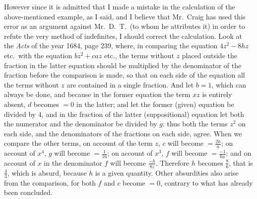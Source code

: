 \documentclass[twoside,openright]{article}
\begin{document}
However since it is admitted that I made a mistake in the calculation
of the above-mentioned example, as I said, and I believe that Mr.\
Craig has used this error as an argument against Mr.\ D.\ T.\ (to whom
he attributes it) in order to refute the very method of indefinites, I
should correct the calculation.  Look at the {\em Acts} of the year
1684, page 239, where, in comparing the equation $4z^2-8hz$ etc.\ with
the equation $bz^2+caz$ etc., the terms without $z$ placed outside the
fraction in the latter equation should be multiplied by the
denominator of the fraction before the comparison is made, so that on
each side of the equation all the terms without $z$ are contained in a
single fraction.  And let $b=1$, which can always be done, and because
in the former equation the term $xz$ is entirely absent, $d$ becomes
$=0$ in the latter; and let the former (given) equation be divided by
$4$, and in the fraction of the latter (suppositional) equation let
both the numerator and the denominator be divided by $g$: thus both
the terms $z^2$ on each side, and the denominators of the fractions on
each side, agree.  When we compare the other terms, on account of the
term $z$, $c$ will become $= \frac{2h}{a}$; on account of $x^4$, $g$
will become $=\frac{1}{16}$; on account of $x^3$, $f$ will become
$= \frac{-1}{6a}$; and on account of $x$ in the denominator $f$ will
become $\frac{-h}{8z}$.  Therefore $h$ becomes $\frac{8}{6}$, that is
$\frac{4}{3}$, which is absurd, because $h$ is a given quantity.
Other absurdities also arise from the comparison, for both $f$ and $c$
become $=0$, contrary to what has already been concluded.
\end{document}
